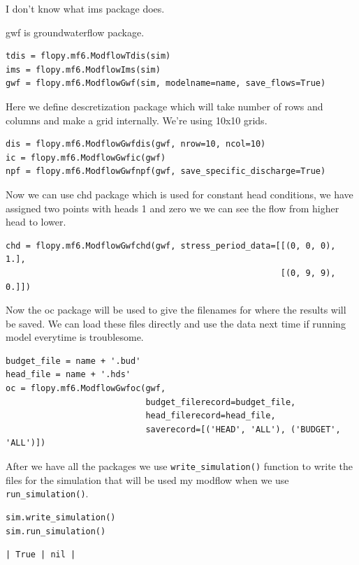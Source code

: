 \documentclass[titlepage,12pt]{unisubmission}
\begin{document}
I don't know what ims package does.

gwf is groundwaterflow package.
\begin{verbatim}
tdis = flopy.mf6.ModflowTdis(sim)
ims = flopy.mf6.ModflowIms(sim)
gwf = flopy.mf6.ModflowGwf(sim, modelname=name, save_flows=True)
\end{verbatim}


Here we define descretization package which will take number of rows and columns and make a grid internally.
We're using 10x10 grids.

\begin{verbatim}
dis = flopy.mf6.ModflowGwfdis(gwf, nrow=10, ncol=10)
ic = flopy.mf6.ModflowGwfic(gwf)
npf = flopy.mf6.ModflowGwfnpf(gwf, save_specific_discharge=True)
\end{verbatim}


Now we can use chd package which is used for constant head conditions, we have assigned two points with heads 1 and zero we we can see the flow from higher head to lower.

\begin{verbatim}
chd = flopy.mf6.ModflowGwfchd(gwf, stress_period_data=[[(0, 0, 0), 1.],
                                                       [(0, 9, 9), 0.]])
\end{verbatim}

Now the oc package will be used to give the filenames for where the results will be saved. We can load these files directly and use the data next time if running model everytime is troublesome.

\begin{verbatim}
budget_file = name + '.bud'
head_file = name + '.hds'
oc = flopy.mf6.ModflowGwfoc(gwf,
                            budget_filerecord=budget_file,
                            head_filerecord=head_file,
                            saverecord=[('HEAD', 'ALL'), ('BUDGET', 'ALL')])
\end{verbatim}

After we have all the packages we use \texttt{write\_simulation()} function to write the files for the simulation that will be used my modflow when we use \texttt{run\_simulation()}.

\begin{verbatim}
sim.write_simulation()
sim.run_simulation()
\end{verbatim}

\begin{verbatim}
| True | nil |
\end{verbatim}
\end{document}
